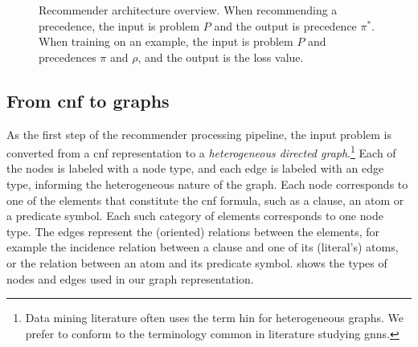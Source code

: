 \begin{figure}[h]
\caption{Recommender architecture overview.
When recommending a precedence, the input is problem $P$ and the output is precedence $\pi^*$.
When training on an example, the input is problem $P$ and precedences $\pi$ and $\rho$,
and the output is the loss value.}
\label{fig:architecture}
\centering
{}
\end{figure}

\subsection{From \gls{cnf} to graphs}

As the first step of the recommender processing pipeline,
the input problem is converted from a \gls{cnf} representation
to a \emph{heterogeneous directed graph}.\footnote{Data mining literature often uses the term \gls{hin} \cite{Shi2015} for heterogeneous graphs.
We prefer to conform to the terminology common in literature studying \glspl{gnn}.}
Each of the nodes is labeled with a node type,
and each edge is labeled with an edge type,
informing the heterogeneous nature of the graph.
Each node corresponds to one of the elements that constitute the \gls{cnf} formula,
such as a clause, an atom or a predicate symbol.
Each such category of elements corresponds to one node type.
The edges represent the (oriented) relations between the elements,
for example the incidence relation between a clause and one of its (literal's) atoms,
or the relation between an atom and its predicate symbol.
 shows the types of nodes and edges used in our graph representation.

